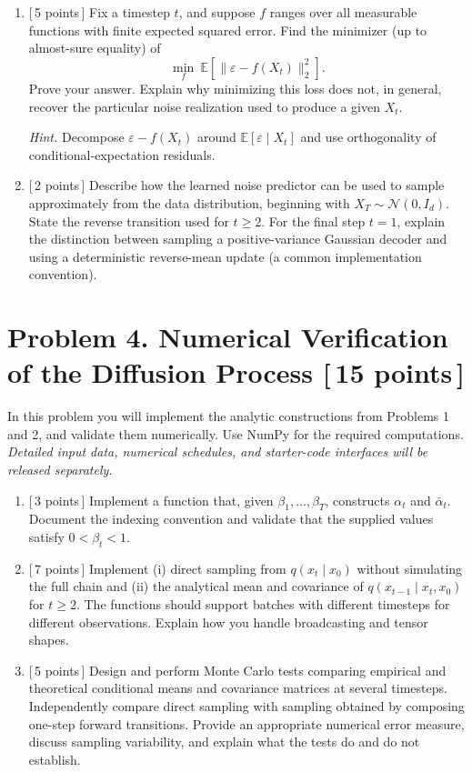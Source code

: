 \documentclass[11pt]{article}
\newcommand{\E}{\mathbb{E}}
\newcommand{\N}{\mathcal{N}}
\newcommand{\hint}[1]{\par\vspace{2pt}\noindent\textit{Hint.} #1\par}
\newcommand{\pts}[1]{\hfill\textnormal{[\,#1 points\,]}}
\begin{document}
\begin{enumerate}
  \item \pts{5} Fix a timestep \(t\), and suppose \(f\) ranges over all measurable
  functions with finite expected squared error. Find the minimizer (up to almost-sure
  equality) of
  \[
      \min_f\ \E\!\left[\|\varepsilon-f(X_t)\|_2^2\right].
  \]
  Prove your answer. Explain why minimizing this loss does not, in general, recover the
  particular noise realization used to produce a given \(X_t\).

  \hint{Decompose \(\varepsilon-f(X_t)\) around
  \(\E[\varepsilon\mid X_t]\) and use orthogonality of conditional-expectation residuals.}

  \item \pts{2} Describe how the learned noise predictor can be used to sample
  approximately from the data distribution, beginning with
  \(X_T\sim\N(0,I_d)\). State the reverse transition used for \(t\ge2\).
  For the final step \(t=1\), explain the distinction between sampling a
  positive-variance Gaussian decoder and using a deterministic reverse-mean update
  (a common implementation convention).
\end{enumerate}

\newpage
\section*{Problem 4. Numerical Verification of the Diffusion Process \pts{15}}

In this problem you will implement the analytic constructions from Problems 1 and 2,
and validate them numerically. Use NumPy for the required computations.
\emph{Detailed input data, numerical schedules, and starter-code interfaces will be
released separately.}

\begin{enumerate}
  \item \pts{3} Implement a function that, given \(\beta_1,\ldots,\beta_T\),
  constructs \(\alpha_t\) and \(\bar\alpha_t\). Document the indexing convention
  and validate that the supplied values satisfy \(0<\beta_t<1\).

  \item \pts{7} Implement (i) direct sampling from \(q(x_t\mid x_0)\) without
  simulating the full chain and (ii) the analytical mean and covariance of
  \(q(x_{t-1}\mid x_t,x_0)\) for \(t\ge2\). The functions should support
  batches with different timesteps for different observations. Explain how you
  handle broadcasting and tensor shapes.

  \item \pts{5} Design and perform Monte Carlo tests comparing empirical and
  theoretical conditional means and covariance matrices at several timesteps.
  Independently compare direct sampling with sampling obtained by composing
  one-step forward transitions. Provide an appropriate numerical error measure,
  discuss sampling variability, and explain what the tests do and do not establish.
\end{enumerate}
\end{document}

